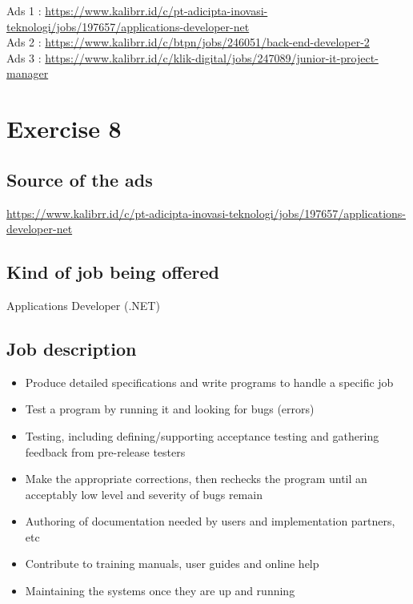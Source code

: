 \documentclass[12pt,titlepage]{article}
\begin{document}
Ads 1 : \url{https://www.kalibrr.id/c/pt-adicipta-inovasi-teknologi/jobs/197657/applications-developer-net} \\
Ads 2 : \url{https://www.kalibrr.id/c/btpn/jobs/246051/back-end-developer-2} \\
Ads 3 : \url{https://www.kalibrr.id/c/klik-digital/jobs/247089/junior-it-project-manager} \\

\section*{Exercise 8}
\subsection*{Source of the ads}
\url{https://www.kalibrr.id/c/pt-adicipta-inovasi-teknologi/jobs/197657/applications-developer-net}
\subsection*{Kind of job being offered}
Applications Developer (.NET) 
\subsection*{Job description}
\begin{itemize}
    \item Produce detailed specifications and write programs to handle a specific job
    \item Test a program by running it and looking for bugs (errors)
    \item Testing, including defining/supporting acceptance testing and gathering feedback from pre-release testers
    \item Make the appropriate corrections, then rechecks the program until an acceptably low level and severity of bugs remain
    \item Authoring of documentation needed by users and implementation partners, etc
    \item Contribute to training manuals, user guides and online help
    \item Maintaining the systems once they are up and running
\end{itemize}
\end{document}
